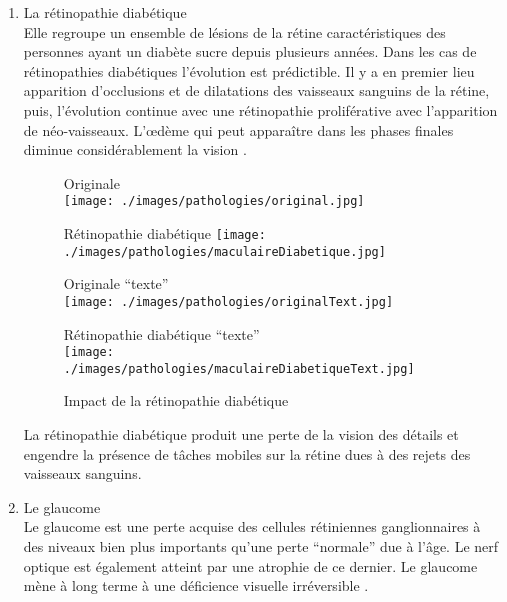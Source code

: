 \documentclass[french,a4paper]{report}
\begin{document}
{\begin{enumerate}
\item La rétinopathie diabétique
\\Elle regroupe un ensemble de lésions de la rétine caractéristiques des personnes ayant un diabète sucre depuis plusieurs années. Dans les cas de rétinopathies diabétiques l'évolution est prédictible. Il y a en premier lieu apparition d'occlusions et de dilatations des vaisseaux sanguins de la rétine, puis, l'évolution continue avec une rétinopathie proliférative avec l'apparition de néo-vaisseaux. L'œdème qui peut apparaître dans les phases finales diminue considérablement la vision \cite{descpatretdiab}.\\
\begin{figure}[H]
\begin{minipage}{0.5\textwidth}
\centering
Originale \\ \vspace{0.2cm}
\texttt{[image: ./images/pathologies/original.jpg]}
\end{minipage}
\begin{minipage}{0.5\textwidth}
\centering
Rétinopathie diabétique\vspace{0.2cm}
\texttt{[image: ./images/pathologies/maculaireDiabetique.jpg]}
\end{minipage}
\begin{minipage}{0.5\textwidth}
\centering
\vspace{0.4cm}Originale \enquote{texte}\\ \vspace{0.1cm}
\texttt{[image: ./images/pathologies/originalText.jpg]}
\end{minipage}
\begin{minipage}{0.5\textwidth}
\centering
\vspace{0.4cm}Rétinopathie diabétique \enquote{texte}\\ \vspace{0.1cm}
\texttt{[image: ./images/pathologies/maculaireDiabetiqueText.jpg]}
\end{minipage}
\caption{Impact de la rétinopathie diabétique}
\end{figure}
\par
La rétinopathie diabétique produit une perte de la vision des détails et engendre la présence de tâches mobiles sur la rétine dues à des rejets des vaisseaux sanguins.
\newline
\item Le glaucome
\\Le glaucome est une perte acquise des cellules rétiniennes ganglionnaires à des niveaux bien plus importants qu'une perte \enquote{normale} due à l'âge. Le nerf optique est également atteint par une atrophie de ce dernier. Le glaucome mène à long terme à une déficience visuelle irréversible \cite{descpatglaucome}.\\

\end{enumerate}}
\end{document}
